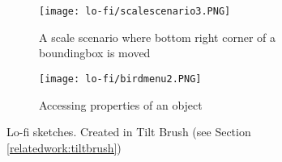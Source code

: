 
\begin{figure}
\begin{subfigure}{.5\textwidth}
  \centering
  \texttt{[image: lo-fi/scalescenario3.PNG]}
  \caption{A scale scenario where bottom right corner of a boundingbox is moved}
  \label{fig:lofi:tilt:scale3}
\end{subfigure}%
\begin{subfigure}{.5\textwidth}
  \centering
  \texttt{[image: lo-fi/birdmenu2.PNG]}
  \caption{Accessing properties of an object}
  \label{fig:lofi:tilt:passivemenu}
\end{subfigure}
\caption{Lo-fi sketches. Created in Tilt Brush (see Section \ref{relatedwork:tiltbrush})}
\label{fig:lofi:tilt}
\end{figure}
